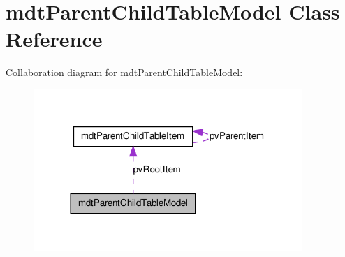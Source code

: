 \hypertarget{classmdt_parent_child_table_model}{
\section{mdtParentChildTableModel Class Reference}
\label{classmdt_parent_child_table_model}
}


Collaboration diagram for mdtParentChildTableModel:\nopagebreak
\begin{figure}[H]
\begin{center}
\leavevmode
\includegraphics[width=288pt]{classmdt_parent_child_table_model__coll__graph}
\end{center}
\end{figure}

